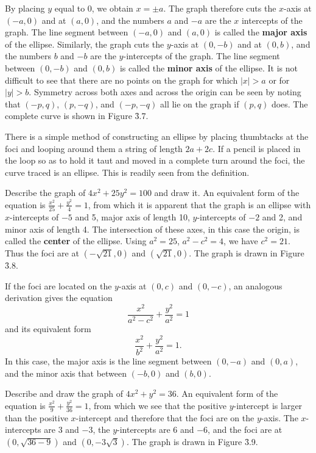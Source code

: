 
By placing $y$ equal to 0, we obtain $x = \pm a$. The graph therefore cuts the $x$-axis at $(-a, 0)$ and at $(a, 0)$, and the numbers $a$ and $-a$ are the $x$ intercepts of the graph. The line segment between $(-a, 0)$ and $(a, 0)$ is called the \textbf{major axis} of the ellipse. Similarly, the graph cuts the $y$-axis at $(0,- b)$ and at $(0, b)$, and the numbers $b$ and $- b$ are the $y$-intercepts of the graph. The line segment between $(0, -b)$ and $(0, b)$ is called the \textbf{minor axis} of the ellipse. It is not difficult to see that there are no points on the graph for which $|x| > a$ or for $|y| > b$. Symmetry across both axes and across the origin can be seen by noting that $(-p, q)$, $(p, -q)$, and $(-p, -q)$ all lie on the graph if $(p, q)$ does. The complete curve is shown in Figure \f{3.7}.

There is a simple method of constructing an ellipse by placing thumbtacks at the foci and looping around them a string of length $2a + 2c$. If a pencil is placed in the loop so as to hold it taut and moved in a complete turn around the foci, the curve traced is an ellipse. This is readily seen from the definition.
\medskip

\begin{example}
Describe the graph of $4x^2 + 25y^2 = 100$ and draw it. An equivalent form of the equation is $\frac{x^2}{25} + \frac{y^2}{4} = 1$, from which it is apparent that the graph is an ellipse with $x$-intercepts of $-5$ and 5, major axis of length 10, $y$-intercepts of $-2$ and 2, and minor axis of length 4. The intersection of these axes, in this case the origin, is called the \textbf{center} of the ellipse. Using $a^2 = 25$, $a^2 - c^2 = 4$, we have $c^2 = 21$. Thus the foci are at $(-\sqrt {21}, 0)$ and $(\sqrt{21}, 0)$. The graph is drawn in Figure \f{3.8}.


If the foci are located on the $y$-axis at $(0, c)$ and $(0, - c)$, an analogous derivation gives the equation
$$
\frac{x^2}{a^2 - c^2} + \frac{y^2}{a^2} = 1
$$
\noindent and its equivalent form 
$$
\frac{x^2}{b^2} + \frac{ y^2}{a^2} = 1.
$$
\noindent In this case, the major axis is the line segment between $(0,-a)$ and $(0, a)$, and the minor axis that between $(-b, 0)$ and $(b, 0)$.
\end{example}
\medskip

\begin{example}
Describe and draw the graph of $4x^2 + y^2 = 36$. An equivalent form of the equation is $\frac{x^2}{9} + \frac{y^2}{36} = 1$, from which we see that the positive $y$-intercept is larger than the positive $x$-intercept and therefore that the foci are on the $y$-axis. The $x$-intercepts are 3 and $-3$, the $y$-intercepts are 6 and $-6$, and the foci are at $(0, \sqrt{36 - 9})$ and $(0, - 3 \sqrt3)$. The graph is drawn in Figure \f{3.9}. 
\end{example}

